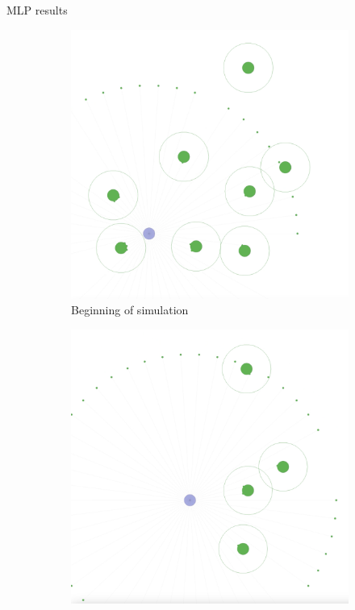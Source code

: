 \documentclass[presentation]{beamer}\mode<presentation>{\usetheme{AMSBolognaFC}}
\begin{document}
\begin{frame}[allowframebreaks]{MLP results}
	\begin{figure}
		\centering
		\begin{subfigure}[b]{0.45\textwidth}
			\centering
			\includegraphics[width=\textwidth]{img/1_agent_1.png}
			\caption{Beginning of simulation}
		\end{subfigure}
		\hfill
		\begin{subfigure}[b]{0.45\textwidth}
			\centering
			\includegraphics[width=\textwidth]{img/1_agent_2.png}

\end{subfigure}
\end{figure}
\end{frame}
\end{document}
